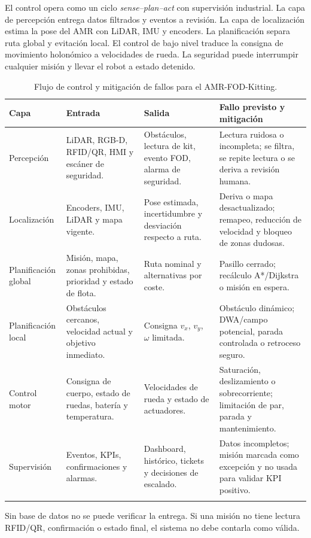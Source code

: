 El control opera como un ciclo \textit{sense--plan--act} con supervisión industrial. La capa de percepción entrega datos filtrados y eventos a revisión. La capa de localización estima la pose del AMR con LiDAR, IMU y encoders. La planificación separa ruta global y evitación local. El control de bajo nivel traduce la consigna de movimiento holonómico a velocidades de rueda. La seguridad puede interrumpir cualquier misión y llevar el robot a estado detenido.

\begin{longtable}{P{0.18\textwidth}P{0.24\textwidth}P{0.24\textwidth}P{0.24\textwidth}}
\toprule
Capa & Entrada & Salida & Fallo previsto y mitigación\\
\midrule
\endhead
Percepción & LiDAR, RGB-D, RFID/QR, HMI y escáner de seguridad. & Obstáculos, lectura de kit, evento FOD, alarma de seguridad. & Lectura ruidosa o incompleta; se filtra, se repite lectura o se deriva a revisión humana.\\
Localización & Encoders, IMU, LiDAR y mapa vigente. & Pose estimada, incertidumbre y desviación respecto a ruta. & Deriva o mapa desactualizado; remapeo, reducción de velocidad y bloqueo de zonas dudosas.\\
Planificación global & Misión, mapa, zonas prohibidas, prioridad y estado de flota. & Ruta nominal y alternativas por coste. & Pasillo cerrado; recálculo A*/Dijkstra o misión en espera.\\
Planificación local & Obstáculos cercanos, velocidad actual y objetivo inmediato. & Consigna \(v_x\), \(v_y\), \(\omega\) limitada. & Obstáculo dinámico; DWA/campo potencial, parada controlada o retroceso seguro.\\
Control motor & Consigna de cuerpo, estado de ruedas, batería y temperatura. & Velocidades de rueda y estado de actuadores. & Saturación, deslizamiento o sobrecorriente; limitación de par, parada y mantenimiento.\\
Supervisión & Eventos, KPIs, confirmaciones y alarmas. & Dashboard, histórico, tickets y decisiones de escalado. & Datos incompletos; misión marcada como excepción y no usada para validar KPI positivo.\\
\bottomrule
\caption{Flujo de control y mitigación de fallos para el AMR-FOD-Kitting.}
\label{tab:arquitectura-control}
\end{longtable}

Sin base de datos no se puede verificar la entrega. Si una misión no tiene lectura RFID/QR, confirmación o estado final, el sistema no debe contarla como válida.
